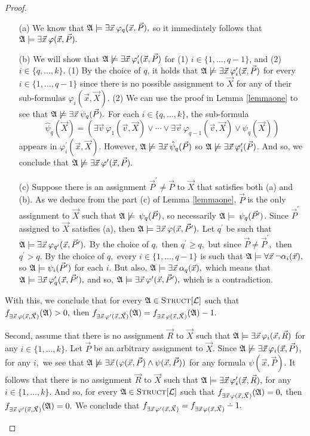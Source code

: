 \documentclass[12pt]{article}
\def\dotminus{\mathbin{\ooalign{\hss\raise1ex\hbox{.}\hss\cr
  \mathsurround=0pt$-$}}}
\def\Truc{\textsc{Struct}[\L]}
\def\A{{\frak A}}
\def\L{{\cal L}}
\def\P{\vec{P}}
\def\R{\vec{R}}
\def\X{\vec{X}}
\def\v{\vec{v}} %
\def\x{\vec{x}} %
\begin{document}
\begin{proof}
\begin{enumerate}
\begin{enumerate}
\item[(a)] We know that $\A\models\exists\x\:\varphi_q(\x,\P),$ so it immediately follows that $\A\models\exists\x\:\varphi(\x,\P).$
\item[(b)] We will show that $\A\not\models\exists\x\:\varphi^\prime_i(\x,\P)$ for (1) $i\in\{1,\ldots,q-1\}$, and (2) $i\in\{q,\ldots,k\}$. (1) By the choice of $q$, it holds that $\A\not\models\exists\x\:\varphi^\prime_i(\x,\P)$ for every $i\in\{1,\ldots,q-1\}$ since there is no possible assignment to $\X$ for any of their sub-formulas $\varphi_i(\x,\X)$. (2) We can use the proof in Lemma \ref{lemmaone} to see that $\A\not\models\exists\x\:\psi_q(\P).$ For each $i\in\{q,\ldots,k\}$, the sub-formula $$ \hat{\psi}_q(\X) =  (\exists\v\:\varphi_1(\v,\X)\vee\cdots\vee\exists\v\:\varphi_{q-1}(\v,\X)\vee\psi_q(\X)) $$ appears in $\varphi^\prime_i(\x,\X)$. However, $\A\not\models\exists\x\:\hat{\psi}_q(\P)$ so $\A\not\models\exists\x\:\varphi^\prime_i(\P)$. And so, we conclude that $\A\not\models\exists\x\:\varphi^\prime(\x,\P).$
\item[(c)] Suppose there is an assignment $\P^\prime \neq \P$ to $\X$ that satisfies both (a) and (b). As we deduce from the part (c) of Lemma \ref{lemmaone}, $\P$ is the only assignment to $\X$ such that $\A\not\models\:\psi_q(\P)$, so necessarily $\A\models\:\psi_q(\P^\prime)$. Since $\P^\prime$ assigned to $\X$ satisfies (a), then $\A\models\exists\x\:\varphi(\x,\P^\prime).$ Let $q^\prime$ be such that $\A\models\exists\x\:\varphi_{q^\prime}(\x,\P^\prime).$ By the choice of $q,$ then $q^\prime \geq q,$ but since $\P \neq \P^\prime,$ then $q^\prime > q.$ By the choice of $q,$ every $i\in\{1,\ldots,q-1\}$ is such that $\A\models\forall\x\:\neg\alpha_i(\x),$ so $\A\models\psi_i(\P^\prime)$ for each $i$. But also, $\A\models\exists\x\:\alpha_q(\x),$ which means that $\A\models\exists\x\:\varphi^\prime_q(\x,\P^\prime),$ and so, $\A\models\exists\x\:\varphi^\prime(\x,\P^\prime),$ which is a contradiction.
\end{enumerate}

With this, we conclude that for every $\A\in\Truc$ such that $f_{\exists\x\,\varphi(\x,\X)}(\A)>0,$ then $f_{\exists\x\,\varphi^\prime(\x,\X)}(\A) = f_{\exists\x\,\varphi(\x,\X)}(\A)-1.$

Second, assume that there is no assignment $\R$ to $\X$ such that $\A\models\exists\x\,\varphi_i(\x,\R)$ for any $i\in\{1,\ldots,k\}$. Let $\P$ be an arbitrary assignment to $\X$. Since $\A\not\models\exists\x\,\varphi_i(\x,\P)$, for any $i,$ we see that $\A\not\models\exists\x\,(\varphi(\x,\P)\wedge\psi(\x,\P))$ for any formula $\psi(\x,\P)$. It follows that there is no assignment $\R$ to $\X$ such that $\A\models\exists\x\,\varphi^\prime_i(\x,\R),$ for any $i\in\{1,\ldots,k\}$. And so, for every $\A\in\Truc$ such that $f_{\exists\x\,\varphi(\x,\X)}(\A)=0,$ then $f_{\exists\x\,\varphi^\prime(\x,\X)}(\A) = 0.$ We conclude that $f_{\exists\x\,\varphi^\prime(\x,\X)} = f_{\exists\x\,\varphi(\x,\X)}\dotminus 1.$


\end{enumerate}
\end{proof}
\end{document}
